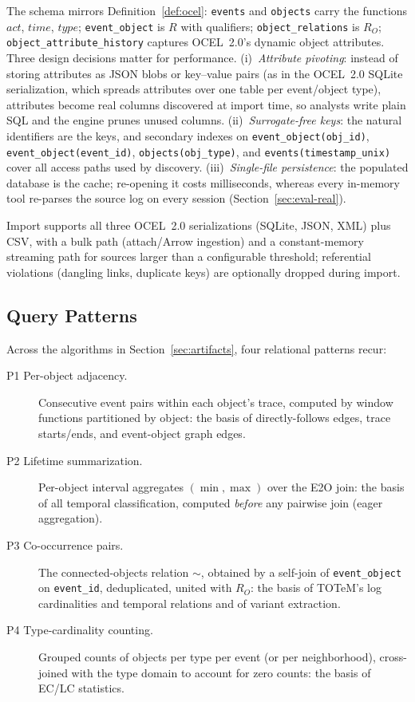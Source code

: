 \documentclass[sigconf, nonacm]{acmart}
\newcommand{\ocel}{OCEL~2.0\xspace}
\begin{document}
\sloppy
The schema mirrors Definition~\ref{def:ocel}: \texttt{events} and \texttt{objects} carry the functions $\mathit{act}$, $\mathit{time}$, $\mathit{type}$; \texttt{event\_object} is $R$ with qualifiers; \texttt{object\_relations} is $R_O$; \texttt{object\_attribute\_history} captures \ocel's dynamic object attributes. Three design decisions matter for performance. (i)~\emph{Attribute pivoting}: instead of storing attributes as JSON blobs or key--value pairs (as in the \ocel SQLite serialization, which spreads attributes over one table per event/object type), attributes become real columns discovered at import time, so analysts write plain SQL and the engine prunes unused columns. (ii)~\emph{Surrogate-free keys}: the natural identifiers are the keys, and secondary indexes on \texttt{event\_object(obj\_id)}, \texttt{event\_object(event\_id)}, \texttt{objects(obj\_type)}, and \texttt{events(timestamp\_unix)} cover all access paths used by discovery. (iii)~\emph{Single-file persistence}: the populated database is the cache; re-opening it costs milliseconds, whereas every in-memory tool re-parses the source log on every session (Section~\ref{sec:eval-real}).
\par\fussy

Import supports all three \ocel serializations (SQLite, JSON, XML) plus CSV, with a bulk path (attach/Arrow ingestion) and a constant-memory streaming path for sources larger than a configurable threshold; referential violations (dangling links, duplicate keys) are optionally dropped during import.

\subsection{Query Patterns}
\label{sec:patterns}

Across the algorithms in Section~\ref{sec:artifacts}, four relational patterns recur:

\begin{description}
\item[P1 Per-object adjacency.] Consecutive event pairs within each object's trace, computed by window functions partitioned by object: the basis of directly-follows edges, trace starts/ends, and event-object graph edges.
\item[P2 Lifetime summarization.] Per-object interval aggregates $(\min,\max)$ over the E2O join: the basis of all temporal classification, computed \emph{before} any pairwise join (eager aggregation).
\item[P3 Co-occurrence pairs.] The connected-objects relation $\sim$, obtained by a self-join of \texttt{event\_object} on \texttt{event\_id}, deduplicated, united with $R_O$: the basis of TOTeM's log cardinalities and temporal relations and of variant extraction.
\item[P4 Type-cardinality counting.] Grouped counts of objects per type per event (or per neighborhood), cross-joined with the type domain to account for zero counts: the basis of EC/LC statistics.
\end{description}
\end{document}
